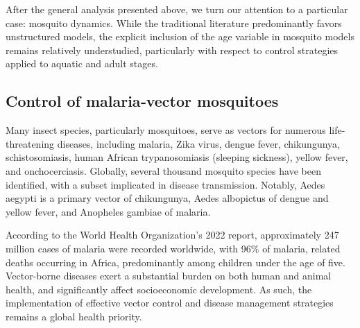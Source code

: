 \documentclass[10pt, a4paper]{amsart}
\theoremstyle{plain}
\theoremstyle{definition}
\theoremstyle{remark}
\newtheorem{remark}[lemma]{Remark}
\numberwithin{equation}{section}
\begin{document}
After the general analysis presented above, we turn our attention to a particular case: mosquito dynamics. While the traditional literature predominantly favors unstructured models, the explicit inclusion of the age variable in mosquito models remains relatively understudied, particularly with respect to control strategies applied to aquatic and adult stages.

\subsection{Control of malaria‑vector mosquitoes}
Many insect species, particularly mosquitoes, serve as vectors for numerous life-threatening diseases, including malaria, Zika virus, dengue fever, chikungunya, schistosomiasis, human African trypanosomiasis (sleeping sickness), yellow fever, and onchocerciasis. Globally, several thousand mosquito species have been identified, with a subset implicated in disease transmission. Notably, Aedes aegypti is a primary vector of chikungunya, Aedes albopictus of dengue and yellow fever, and Anopheles gambiae of malaria.

According to the World Health Organization's 2022 report, approximately 247 million cases of malaria were recorded worldwide, with 96\% of malaria, related deaths occurring in Africa, predominantly among children under the age of five. Vector-borne diseases exert a substantial burden on both human and animal health, and significantly affect socioeconomic development. As such, the implementation of effective vector control and disease management strategies remains a global health priority.
\end{document}
